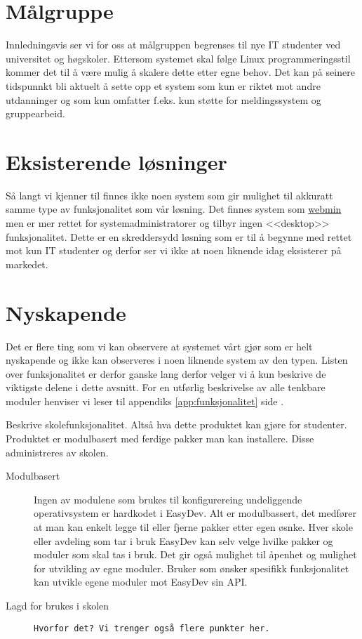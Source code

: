 \section{Målgruppe} \label{sec:målgruppe}
Innledningsvis ser vi for oss at målgruppen begrenses til nye IT studenter ved universitet og høgskoler. Ettersom systemet skal følge Linux programmeringsstil\cite{book:unixprog} kommer det til å være mulig å skalere dette etter egne behov. Det kan på seinere tidspunnkt bli aktuelt å sette opp et system som kun er riktet mot andre utdanninger og som kun omfatter f.eks. kun støtte for meldingssystem og gruppearbeid.

\section{Eksisterende løsninger}
Så langt vi kjenner til finnes ikke noen system som gir mulighet til akkuratt samme type av funksjonalitet som vår løsning. Det finnes system som \href{http://en.wikipedia.org/wiki/Webmin}{webmin} men er mer rettet for systemadministratorer og tilbyr ingen <<desktop>> funksjonalitet. Dette er en skreddersydd løsning som er til å begynne med rettet mot kun IT studenter og derfor ser vi ikke at noen liknende idag eksisterer på markedet. 

\section{Nyskapende}
Det er flere ting som vi kan observere at systemet vårt gjør som er helt nyskapende og ikke kan observeres i noen liknende system av den typen. Listen over funksjonalitet er derfor ganske lang derfor velger vi å kun beskrive de viktigste delene i dette avsnitt. For en utførlig beskrivelse av alle tenkbare moduler henviser vi leser til appendiks \ref{app:funksjonalitet} side \pageref{app:funksjonalitet}.

Beskrive skolefunksjonalitet. Altså hva dette produktet kan gjøre for studenter.
Produktet er modulbasert med ferdige pakker man kan installere. Disse administreres av skolen.
\begin{description}
\item[Modulbasert]
Ingen av modulene som brukes til konfigurereing undeliggende operativsystem er hardkodet i EasyDev. Alt er modulbassert, det medfører at man kan enkelt legge til eller fjerne pakker etter egen øsnke. Hver skole eller avdeling som tar i bruk EasyDev kan selv velge hvilke pakker og moduler som skal tas i bruk. Det gir også mulighet til åpenhet og mulighet for utvikling av egne moduler. Bruker som ønsker spesifikk funksjonalitet kan utvikle egene moduler mot EasyDev sin API. 
\item[Lagd for brukes i skolen]
\texttt{Hvorfor det? Vi trenger også flere punkter her.}
\end{description}